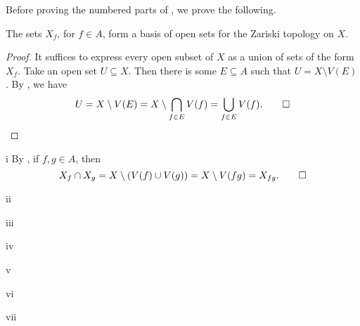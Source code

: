 Before proving the numbered parts of , we prove the following.

\begin{claim}
The sets \(X_f\), for \(f \in A\), form a basis of open sets for the Zariski topology on \(X\).
\end{claim}

\begin{proof}
It suffices to express every open subset of \(X\) as a union of sets of the form \(X_f\).
Take an open set \(U \subseteq X\).
Then there is some \(E \subseteq A\) such that \(U = X \setminus V(E)\).
By , we have
\begin{equation*}
U
= X \setminus V(E)
= X \setminus \bigcap_{f \in E} V(f)
= \bigcup_{f \in E} V(f).
\qedhere
\end{equation*}
\end{proof}

\begin{partsolution}{i}
By , if \(f, g \in A\), then
\begin{equation*}
X_f \cap X_g = X \setminus (V(f) \cup V(g)) = X \setminus V(f g) = X_{f g}.
\qedhere
\end{equation*}
\end{partsolution}

\begin{partsolution}{ii}

\end{partsolution}

\begin{partsolution}{iii}

\end{partsolution}

\begin{partsolution}{iv}

\end{partsolution}

\begin{partsolution}{v}

\end{partsolution}

\begin{partsolution}{vi}

\end{partsolution}

\begin{partsolution}{vii}

\end{partsolution}